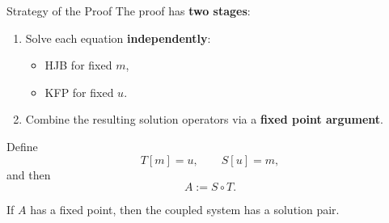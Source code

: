\documentclass[aspectratio=169]{beamer}
\begin{document}
\begin{frame}{Strategy of the Proof}
The proof has \textbf{two stages}:

\vspace{0.2cm}

\begin{enumerate}
    \item Solve each equation \textbf{independently}:
    \begin{itemize}
        \item HJB for fixed \(m\),
        \item KFP for fixed \(u\).
    \end{itemize}

    \item Combine the resulting solution operators via a \textbf{fixed point argument}.
\end{enumerate}

\vspace{0.5cm}

Define
\[
T[m] = u, \qquad S[u] = m,
\]
and then
\[
A := S\circ T.
\]

If \(A\) has a fixed point, then the coupled system has a solution pair.
\end{frame}
\end{document}
